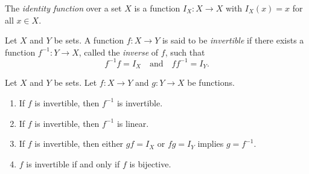 \begin{definition}
  \label{def:identity-function}
  The \emph{identity function} over a set $X$ is a function $I_X: X \to X$
  with $I_X(x) = x$ for all $x \in X$.
\end{definition}

\begin{definition}
  \label{def:invertibility}
  Let $X$ and $Y$ be sets.
  A function $f: X \to Y$ is said to be \emph{invertible} if there exists a
  function $f^{-1}: Y \to X$, called the \emph{inverse} of $f$, such that
  \begin{equation*}
    f^{-1}f = I_X
    \quad \text{and} \quad
    ff^{-1} = I_Y.
  \end{equation*}
\end{definition}

\begin{proposition}
  \label{prop:inverse}
  Let $X$ and $Y$ be sets.
  Let $f: X \to Y$ and $g: Y \to X$ be functions.
  \begin{enumerate}
    \item If $f$ is invertible, then $f^{-1}$ is invertible.
    \item If $f$ is invertible, then $f^{-1}$ is linear.
    \item If $f$ is invertible, then either $gf = I_X$ or $fg = I_Y$ implies
    $g = f^{-1}$.
    \item $f$ is invertible if and only if $f$ is bijective.
  \end{enumerate}
\end{proposition}
